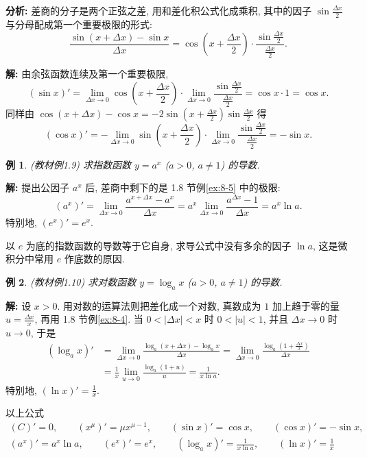 \documentclass[UTF8,openany]{ctexbook}
\theoremstyle{chinesetextbook}
\newtheorem{example}{例}[section]
\newenvironment{cnsolution}{\par\indent\textbf{解:} \ignorespaces}{\par}
\begin{document}
\par\indent\textbf{分析:} 差商的分子是两个正弦之差, 用和差化积公式化成乘积, 其中的因子 $\displaystyle\sin\frac{\Delta x}2$ 与分母配成第一个重要极限的形式:
\[
\frac{\sin(x+\Delta x)-\sin x}{\Delta x}=\cos\left(x+\frac{\Delta x}2\right)\cdot\frac{\sin\frac{\Delta x}2}{\frac{\Delta x}2}.
\]
\begin{cnsolution}
由余弦函数连续及第一个重要极限,
\[
(\sin x)'=\lim_{\Delta x\to0}\cos\left(x+\frac{\Delta x}2\right)\cdot\lim_{\Delta x\to0}\frac{\sin\frac{\Delta x}2}{\frac{\Delta x}2}=\cos x\cdot1=\cos x.
\]
同样由 $\displaystyle\cos(x+\Delta x)-\cos x=-2\sin\left(x+\frac{\Delta x}2\right)\sin\frac{\Delta x}2$ 得
\[
(\cos x)'=-\lim_{\Delta x\to0}\sin\left(x+\frac{\Delta x}2\right)\cdot\lim_{\Delta x\to0}\frac{\sin\frac{\Delta x}2}{\frac{\Delta x}2}=-\sin x.
\]
\end{cnsolution}
\begin{example}\label{ex:c2-1-9}
\textnormal{(教材例1.9)} 求指数函数 $y=a^x$ ($a>0$, $a\ne1$) 的导数.
\end{example}
\begin{cnsolution}
提出公因子 $a^x$ 后, 差商中剩下的是 1.8 节例\ref{ex:8-5} 中的极限:
\[
(a^x)'=\lim_{\Delta x\to0}\frac{a^{x+\Delta x}-a^x}{\Delta x}=a^x\lim_{\Delta x\to0}\frac{a^{\Delta x}-1}{\Delta x}=a^x\ln a.
\]
特别地, $(e^x)'=e^x$.
\end{cnsolution}
以 $e$ 为底的指数函数的导数等于它自身, 求导公式中没有多余的因子 $\ln a$, 这是微积分中常用 $e$ 作底数的原因.
\begin{example}\label{ex:c2-1-10}
\textnormal{(教材例1.10)} 求对数函数 $y=\log_ax$ ($a>0$, $a\ne1$) 的导数.
\end{example}
\begin{cnsolution}
设 $x>0$. 用对数的运算法则把差化成一个对数, 真数成为 $1$ 加上趋于零的量 $\displaystyle u=\frac{\Delta x}x$, 再用 1.8 节例\ref{ex:8-4}. 当 $0<|\Delta x|<x$ 时 $0<|u|<1$, 并且 $\Delta x\to0$ 时 $u\to0$, 于是
\[
\begin{aligned}
(\log_ax)'&=\lim_{\Delta x\to0}\frac{\log_a(x+\Delta x)-\log_ax}{\Delta x}=\lim_{\Delta x\to0}\frac{\log_a\left(1+\frac{\Delta x}x\right)}{\Delta x}\\
&=\frac1x\lim_{u\to0}\frac{\log_a(1+u)}u=\frac1{x\ln a}.
\end{aligned}
\]
特别地, $\displaystyle(\ln x)'=\frac1x$.
\end{cnsolution}
以上公式
\[
\begin{gathered}
(C)'=0,\qquad(x^\mu)'=\mu x^{\mu-1},\qquad(\sin x)'=\cos x,\qquad(\cos x)'=-\sin x,\\
(a^x)'=a^x\ln a,\qquad(e^x)'=e^x,\qquad(\log_ax)'=\frac1{x\ln a},\qquad(\ln x)'=\frac1x
\end{gathered}
\]
\end{document}
